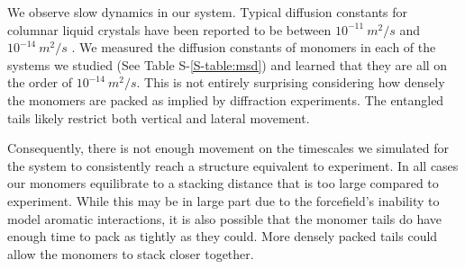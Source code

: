 \documentclass[journal=jpcbfk,manuscript=article]{achemso}
\begin{document}
  We observe slow dynamics in our system. Typical diffusion constants for columnar
  liquid crystals have been reported to be between $10^{-11}~ m^2/s$ 
  \cite{dong_translational_1984} and $10^{-14}~m^2/s$ \cite{dvinskikh_molecular_2002}. 
  We measured the diffusion constants of monomers in each of the systems we studied 
  (See Table S-\ref{S-table:msd}) and learned that they are all on the order of 
  $10^{-14}~m^2/s$. This is not entirely surprising considering how densely the 
  monomers are packed as implied by diffraction experiments. The entangled tails 
  likely restrict both vertical and lateral movement.
  


  Consequently, there is not enough movement on the timescales we simulated for the system to 
  consistently reach a structure equivalent to experiment. In all cases our monomers
  equilibrate to a stacking distance that is too large compared to experiment. 
  While this may be in large part due to the forcefield's inability to model aromatic
  interactions, it is also possible that the monomer tails do have enough time to pack 
  as tightly as they could. More densely packed tails could allow the monomers to stack
  closer together. 
  
\end{document}
